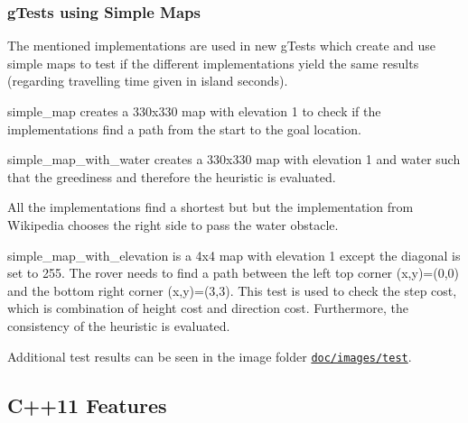 \subsubsection*{g\+Tests using Simple Maps}

The mentioned implementations are used in new g\+Tests which create and use simple maps to test if the different implementations yield the same results (regarding travelling time given in island seconds).


\begin{DoxyEnumerate}
\item simple\+\_\+map creates a 330x330 map with elevation 1 to check if the implementations find a path from the start to the goal location.
\end{DoxyEnumerate}




\begin{DoxyEnumerate}
\item simple\+\_\+map\+\_\+with\+\_\+water creates a 330x330 map with elevation 1 and water such that the greediness and therefore the heuristic is evaluated.
\end{DoxyEnumerate}



All the implementations find a shortest but but the implementation from Wikipedia chooses the right side to pass the water obstacle.


\begin{DoxyEnumerate}
\item simple\+\_\+map\+\_\+with\+\_\+elevation is a 4x4 map with elevation 1 except the diagonal is set to 255. The rover needs to find a path between the left top corner (x,y)=(0,0) and the bottom right corner (x,y)=(3,3). This test is used to check the step cost, which is combination of height cost and direction cost. Furthermore, the consistency of the heuristic is evaluated.
\end{DoxyEnumerate}



Additional test results can be seen in the image folder \href{doc/images/test}{\tt doc/images/test}.

\subsection*{C++11 Features}

